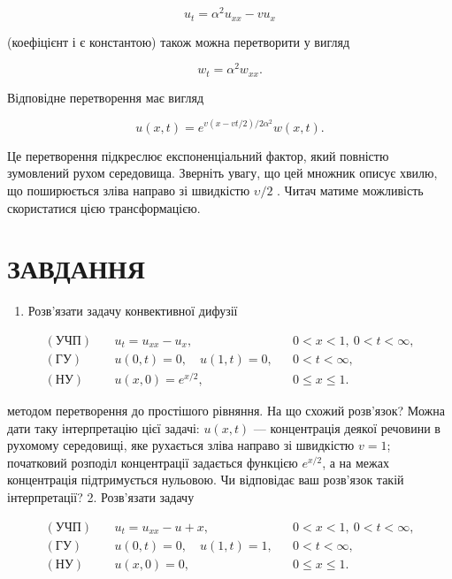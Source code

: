 \documentclass[
  ukrainian,
]{article}
\providecommand{\tightlist}{%
  \setlength{\itemsep}{0pt}\setlength{\parskip}{0pt}}
\begin{document}
\[
u_t = \alpha^2 u_{xx} - v u_x
\]

(коефіцієнт і є константою) також можна перетворити у вигляд

\[
w_t = \alpha^2 w_{xx}.
\]

Відповідне перетворення має вигляд

\[
u(x, t) = e^{v(x-vt/2)/2\alpha^2}w(x, t).
\]

Це перетворення підкреслює експоненціальний фактор, який повністю
зумовлений рухом середовища. Зверніть увагу, що цей множник описує
хвилю, що поширюється зліва направо зі швидкістю \(\upsilon/2\) . Читач
матиме можливість скористатися цією трансформацією.

\section{ЗАВДАННЯ}\label{ux437ux430ux432ux434ux430ux43dux43dux44f-7}

\begin{enumerate}
\def\labelenumi{\arabic{enumi}.}
\tightlist
\item
  Розв'язати задачу конвективної дифузії
\end{enumerate}

\[
\begin{aligned}
(\text{УЧП})\quad & u_t = u_{xx} - u_x, && 0 < x < 1,\ 0 < t < \infty, \\
(\text{ГУ})\quad & u(0,t) = 0,\quad u(1,t) = 0, && 0 < t < \infty, \\
(\text{НУ})\quad & u(x,0) = e^{x/2}, && 0 \leqslant x \leqslant 1.
\end{aligned}
\]

методом перетворення до простішого рівняння. На що схожий розв'язок?
Можна дати таку інтерпретацію цієї задачі: \(u(x,t)\) --- концентрація
деякої речовини в рухомому середовищі, яке рухається зліва направо зі
швидкістю \(v = 1\); початковий розподіл концентрації задається функцією
\(e^{x/2}\), а на межах концентрація підтримується нульовою. Чи
відповідає ваш розв'язок такій інтерпретації? 2. Розв'язати задачу

\[
\begin{aligned}
(\text{УЧП})\quad & u_t = u_{xx} - u + x, && 0 < x < 1,\ 0 < t < \infty, \\
(\text{ГУ})\quad & u(0,t) = 0,\quad u(1,t) = 1, && 0 < t < \infty, \\
(\text{НУ})\quad & u(x,0) = 0, && 0 \leqslant x \leqslant 1.
\end{aligned}
\]
\end{document}
